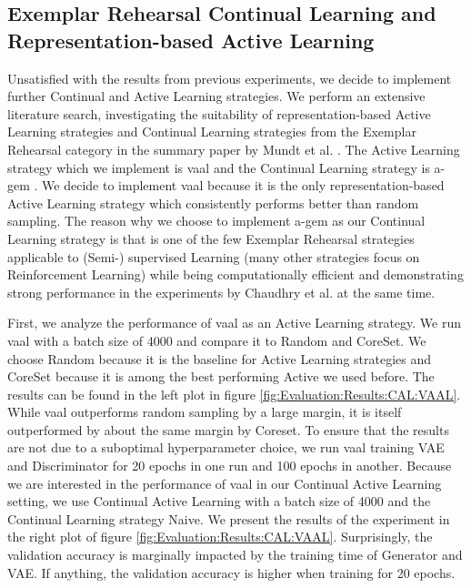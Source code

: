 \subsection{Exemplar Rehearsal Continual Learning and Representation-based Active Learning}
\label{sec:Evaluation:Results:CAL:VAAL_AGEM}
Unsatisfied with the results from previous experiments, we decide to implement further Continual and Active Learning strategies. We perform an extensive literature search, investigating the suitability of representation-based Active Learning strategies and Continual Learning
strategies from the Exemplar Rehearsal category in the summary paper by Mundt et al. \cite{mundt2020wholistic}. The Active Learning strategy which we implement is \gls{vaal} \cite{sinha2019variational} and the Continual Learning strategy is \gls{a-gem} \cite{chaudhry2018efficient}. We decide
to implement \gls{vaal} because it is the only representation-based Active Learning strategy which consistently performs better than random sampling. The reason why we choose to implement \gls{a-gem} as our Continual Learning strategy is that is one of the few Exemplar Rehearsal strategies
applicable to (Semi-) supervised Learning (many other strategies focus on Reinforcement Learning) while being computationally efficient and demonstrating strong performance in the experiments by Chaudhry et al. \cite{chaudhry2018efficient} at the same time. \par
First, we analyze the performance of \gls{vaal} as an Active Learning strategy. We run \gls{vaal} with a batch size of 4000 and compare it to Random and CoreSet. We choose Random because it is the baseline for Active Learning strategies and CoreSet because it is among the best performing Active
we used before. The results can be found in the left plot in figure \ref{fig:Evaluation:Results:CAL:VAAL}. While \gls{vaal} outperforms random sampling by a large margin, it is itself outperformed by about the same margin by Coreset. To ensure that the results are not due to a
suboptimal hyperparameter choice, we run \gls{vaal} training VAE and Discriminator for 20 epochs in one run and 100 epochs in another. Because we are interested in the performance of \gls{vaal} in our Continual Active Learning setting, we use Continual Active Learning with a batch size of 4000
and the Continual Learning strategy Naive. We present the results of the experiment in the right plot of figure \ref{fig:Evaluation:Results:CAL:VAAL}. Surprisingly, the validation accuracy is marginally impacted by the training time of Generator and VAE. If anything, the validation
accuracy is higher when training for 20 epochs. \par


